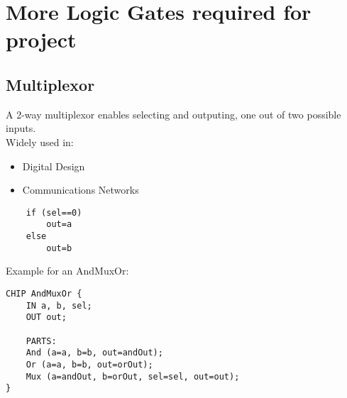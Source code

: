 \section{More Logic Gates required for project}

\subsection{Multiplexor}

A 2-way multiplexor enables selecting and outputing, one out of 
two possible inputs.\\

Widely used in:
\begin{itemize}
    \item Digital Design
    \item Communications Networks
\end{itemize}

\begin{lstlisting}
    if (sel==0)
        out=a
    else
        out=b
\end{lstlisting}

Example for an AndMuxOr:

\begin{lstlisting}
CHIP AndMuxOr {
    IN a, b, sel;
    OUT out;

    PARTS:
    And (a=a, b=b, out=andOut);
    Or (a=a, b=b, out=orOut);
    Mux (a=andOut, b=orOut, sel=sel, out=out);
}
\end{lstlisting}
